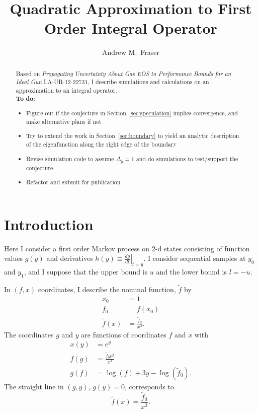 \documentclass[twocolumn]{article}
\title{Quadratic Approximation to First Order Integral Operator}
\author{Andrew M.\ Fraser}
\begin{document}
\maketitle
\begin{abstract}
  Based on \emph{Propagating Uncertainty About Gas EOS to Performance
    Bounds for an Ideal Gun} LA-UR-12-22731, I describe simulations
  and calculations on an approximation to an
  integral operator.\\
  \textbf{To do:}
  \begin{itemize}
  \item Figure out if the conjecture in Section~\ref{sec:speculation}
    implies convergence, and make alternative plans if not
  \item Try to extend the work in Section~\ref{sec:boundary} to yield
    an analytic description of the eigenfunction along the right edge
    of the boundary
  \item Revise simulation code to assume $\Delta_y = 1$ and do
    simulations to test/support the conjecture.
  \item Refactor and submit for publication.
  \end{itemize}

\end{abstract}
\section{Introduction}
  \label{sec:introduction}

Here I consider a first order Markov process on 2-d states consisting
of function values $g(y)$ and derivatives $h(y) \equiv \left. \frac{d
    g }{d t} \right|_{t=y}$.  I consider sequential samples at $y_0$
and $y_1$, and I suppose that the upper bound is $u$ and the lower
bound is $l=-u$.

In $(f,x)$ coordinates, I describe the nominal function, $\tilde f$ by
\begin{align*}
  x_0 &= 1\\
  f_0 &= f(x_0) \\
  \tilde f(x) &= \frac{\tilde f_0}{x^3}.
\end{align*}
The coordinates $g$ and $y$ are functions of coordinates $f$ and $x$ with
\begin{align*}
  x(y) &= e^y \\
  f(g) &= \frac{\tilde f_0 e^{g}}{x^3} \\
  g(f) &= \log(f) + 3y - \log(\tilde f_0).
\end{align*}
The straight line in $(g,y)$, $g(y) = 0$, corresponds to
\begin{equation*}
  \tilde f(x) = \frac{\tilde f_0}{x^3}.
\end{equation*}
\end{document}
